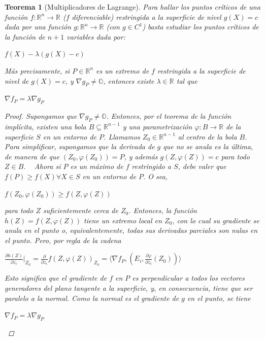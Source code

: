 \documentclass[]{article}
\newtheorem{teo}{Teorema}
\def\R{\mathbb{R}}
\newcommand{\ip}[2]{\langle #1,#2 \rangle}
\newcommand{\dprim}[2]{\frac{\partial #1}{\partial #2}}
\begin{document}
\begin{teo}[Multiplicadores de Lagrange]
	Para hallar los puntos críticos de una función $f:\R^n\to\R$ ($f$ diferenciable) restringida a la superficie de nivel $g(X) = c$ dada por una función $g:\R^n\to\R$ (con $g\in C^1$) basta estudiar los puntos críticos de la función de $n+1$ variables dada por:
	\begin{center}
		$f(X)-\lambda(g(X)-c)$
	\end{center}
	Más precisamente, si $P \in \R^n$ es un extremo de $f$ restringida a la superficie de nivel de $g(X)=c$, y $\nabla g_P \neq \mathds{O}$, entonces existe $\lambda \in \R$ tal que
	\begin{center}
		$\nabla f_P = \lambda \nabla g_P$
	\end{center}
	\begin{proof}
		Supongamos que $\nabla g_P \neq \mathds{O}$. Entonces, por el teorema de la función implícita, existen una bola $B\subseteq \R^{n-1}$ y una parametrización $\varphi:B\to\R$ de la superficie $S$ en un entorno de $P$. Llamamos $Z_0 \in \R^{n-1}$ al centro de la bola $B$. Para simplificar, supongamos que la derivada de $g$ que no se anula es la última, de manera de que $(Z_0,\varphi(Z_0))=P$, y además $g(Z,\varphi(Z)) = c$ para todo $Z\in B$.
		~\newline
		Ahora si $P$ es un máximo de $f$ restringido a $S$, debe valer que $f(P) \geq f(X) \forall X\in S$ en un entorno de $P$. O sea,
		\begin{center}
			$f(Z_0,\varphi(Z_0)) \geq f(Z,\varphi(Z))$
		\end{center}
		para todo $Z$ suficientemente cerca de $Z_0$. Entonces, la función $h(Z)=f(Z,\varphi(Z))$ tiene un extremo local en $Z_0$, con lo cual su gradiente se anula en el punto o, equivalentemente, todas sus derivadas parciales son nulas en el punto. Pero, por regla de la cadena
		\begin{center}
			$\displaystyle \dprim{h(Z)}{z_i}|_{Z_0} = \dprim{}{z_i}f(Z,\varphi(Z))_{Z_0} = \ip{\nabla f_P}{(E_i,\dprim{\varphi}{z_i}(Z_0))}$
		\end{center}
		Esto significa que el gradiente de $f$ en $P$ es perpendicular a todos los vectores generadores del plano tangente a la superficie, y, en consecuencia, tiene que ser paralelo a la normal. Como la normal es el gradiente de $g$ en el punto, se tiene
		\begin{center}
			$\displaystyle \nabla f_P = \lambda \nabla g_P$
		\end{center}
	\end{proof}
\end{teo}
\end{document}
